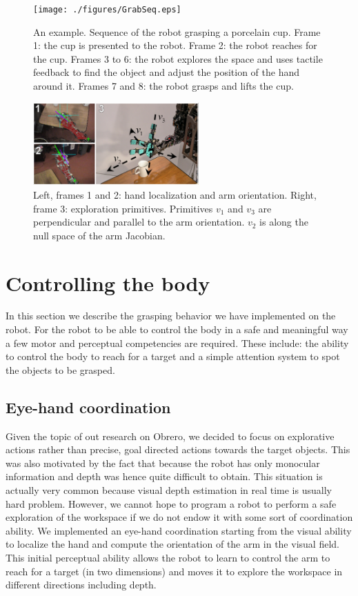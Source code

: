 \begin{figure}[tb]
\centerline{
\texttt{[image: ./figures/GrabSeq.eps]}
} \caption{An example. Sequence of the robot grasping a porcelain
cup. Frame 1: the cup is presented to the robot. Frame 2: the
robot reaches for the cup. Frames 3 to 6:  the robot explores the
space and uses tactile feedback to find the object and adjust the
position of the hand around it. Frames 7 and 8: the robot grasps
and lifts the cup.} \label{fig-sequence}
\end{figure}

\begin{figure}[tb]
  \centerline{
    \includegraphics[width=2.5in, angle=0 ]{./figures/expl-directions.eps}
  }\caption{Left, frames 1 and 2: hand localization and arm 
    orientation. Right, frame 3: exploration primitives. Primitives $v_1$ 
and $v_3$ are perpendicular and parallel to the arm orientation. $v_2$ is 
along the null space of the arm Jacobian.}
\label{fig-expl-directions}
\end{figure}

\section{Controlling the body}
\label{sec:controlling}

In this section we describe the grasping behavior we have implemented
on the robot. For the robot to be able to control the body in a safe
and meaningful way a few motor and perceptual competencies are required.
These include: the ability to control the body to reach for a target and 
a simple attention system to spot the objects to be grasped.

\subsection{Eye-hand coordination}
Given the topic of out research on Obrero, we decided to focus on explorative 
actions rather than precise, goal directed actions towards the target objects.
This was also motivated by the fact that because the robot has only monocular 
information and depth was hence quite difficult to obtain. This situation is 
actually very common because visual depth estimation in real time is usually 
 hard problem.
However, we cannot hope to program a robot to perform a safe exploration 
of the workspace if we do not endow it with some sort of coordination ability.
We implemented an eye-hand coordination starting from the visual ability to 
localize the hand and compute the orientation of the arm in the visual field. 
This initial perceptual ability allows the robot to learn to control the arm 
to reach for a target (in two dimensions) and moves it to explore the workspace
in different directions including depth.

